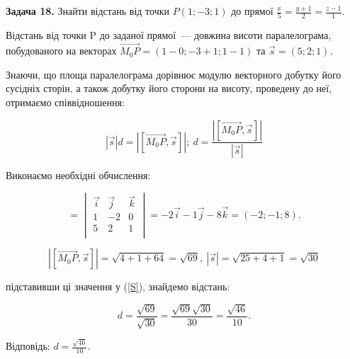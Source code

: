 \documentclass[14pt,draft]{extreport}
\begin{document}
\bigskip \textbf{Задача 18.} Знайти відстань від точки $P(1;-3;1)$
до прямої $\frac{x}{5}=\frac{y+1}{2}=\frac{z-1}{1}.$\bigskip

\begin{wrapfigure}{l}{5.3cm}
	\centering

\caption{}
\end{wrapfigure}

Відстань від точки P до заданої прямої~--- довжина висоти паралелограма,
побудованого на векторах $\vec{M_0P}=(1-0;-3+1;1-1)$ та $\vec s=(5;2;1)$.

Знаючи, що площа паралелограма дорівнює модулю векторного добутку його
сусідніх сторін, а також добутку його сторони на висоту, проведену до
неї, отримаємо співвідношення:

\begin{equation}
	{|\vec s|}d=|[\vec{M_0P},\vec s]|;~
	d=\frac{|[\vec{M_0P},\vec s]|}{|\vec s|}
	\label{S}
\end{equation}

Виконаємо необхідні обчислення:

\begin{equation}
	[\vec{M_0P},\vec s]=
	\begin{vmatrix}
		\vec i & \vec j & \vec k \\
		1 & -2 & 0 \\
		5 & 2 & 1 \\
	\end{vmatrix}=
	-2\vec i -1\vec j -8\vec k  = (-2;-1;8).
\end{equation}

\begin{equation}
	|[\vec{M_0P},\vec s]|=\sqrt{4+1+64}=\sqrt{69},~
	|\vec s| = \sqrt{25+4+1}=\sqrt{30}
\end{equation}

підставивши ці значення у (\ref{S}), знайдемо відстань:

\begin{equation}
	d=\frac{\sqrt{69}}{\sqrt{30}}=\frac{\sqrt{69}\sqrt{30}}{30}=
	\frac{\sqrt{46}}{10}.
\end{equation}

\null\hfill
\begin{boxedminipage}{0.27\textwidth}
	Відповідь: $d=\frac{\sqrt{46}}{10}.$
\end{boxedminipage}
\end{document}

